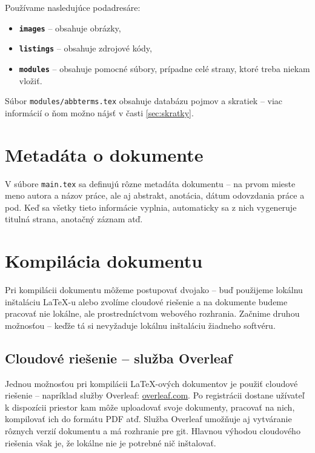 Používame nasledujúce podadresáre:
\begin{itemize}
\item \textbf{\texttt{images}} -- obsahuje obrázky,
\item \textbf{\texttt{listings}} -- obsahuje zdrojové kódy,
\item \textbf{\texttt{modules}} -- obsahuje pomocné súbory, prípadne celé strany, ktoré treba niekam vložiť.
\end{itemize}

Súbor \texttt{modules/abbterms.tex} obsahuje databázu pojmov a skratiek -- viac informácií o ňom možno nájsť v časti \ref{sec:skratky}.

\section{Metadáta o dokumente}

V súbore \texttt{main.tex} sa definujú rôzne metadáta dokumentu -- na prvom mieste meno autora a názov práce, ale aj abstrakt, anotácia, dátum odovzdania práce a pod. Keď sa všetky tieto informácie vyplnia, automaticky sa z nich vygeneruje titulná strana, anotačný záznam atď.

\section{Kompilácia dokumentu}

Pri kompilácii dokumentu môžeme postupovať dvojako -- buď použijeme lokálnu inštaláciu LaTeX-u alebo zvolíme cloudové riešenie a na dokumente budeme pracovať nie lokálne, ale prostredníctvom webového rozhrania. Začnime druhou možnosťou -- keďže tá si nevyžaduje lokálnu inštaláciu žiadneho softvéru.

\subsection{Cloudové riešenie -- služba Overleaf}

Jednou možnosťou pri kompilácii LaTeX-ových dokumentov je použiť cloudové riešenie -- napríklad služby Overleaf: \href{https://www.overleaf.com/}{overleaf.com}. Po registrácii dostane užívateľ k dispozícii priestor kam môže uploadovať svoje dokumenty, pracovať na nich, kompilovať ich do formátu PDF atď. Služba Overleaf umožňuje aj vytváranie rôznych verzií dokumentu a má rozhranie pre git. Hlavnou výhodou cloudového riešenia však je, že lokálne nie je potrebné nič inštalovať.

